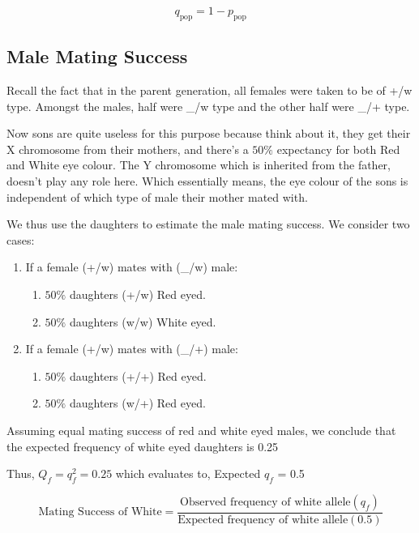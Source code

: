 			\begin{equation}
				q_\text{pop}=1-p_\text{pop}
			\end{equation}
	\subsection{Male Mating Success}
		Recall the fact that in the parent generation, all females were taken to be of +/w type. Amongst the males, half were \_/w type and the other half were \_/+ type.
		\par
		Now sons are quite useless for this purpose because think about it, they get their X chromosome from their mothers, and there's a $50\%$ expectancy for both Red and White eye colour. The Y chromosome which is inherited from the father, doesn't play any role here. Which essentially means, the eye colour of the sons is independent of which type of male their mother mated with.
		\par
		We thus use the daughters to estimate the male mating success. We consider two cases:
		\begin{enumerate}
			\item If a female (+/w) mates with (\_/w) male:
				\begin{enumerate}
					\item $50\%$ daughters (+/w) Red eyed.
					\item $50\%$ daughters (w/w) White eyed.
				\end{enumerate}
			\item If a female (+/w) mates with (\_/+) male:
				\begin{enumerate}
					\item $50\%$ daughters (+/+) Red eyed.
					\item $50\%$ daughters (w/+) Red eyed.
				\end{enumerate}
		\end{enumerate}
		Assuming equal mating success of red and white eyed males, we conclude that the expected frequency of white eyed daughters is 0.25
		\par
		Thus, $Q_f=q_f^2 = 0.25$ which evaluates to, Expected $q_f$ = 0.5
		\par
		\begin{equation}
			\text{Mating Success of White} = \frac{\text{Observed frequency of white allele} (q_f)}{\text{Expected frequency of white allele} (0.5)}
		\end{equation}
